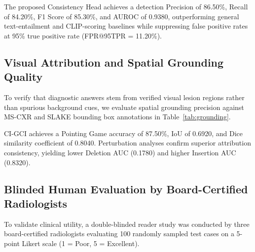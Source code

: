 \documentclass[journal,twoside,web]{ieeecolor}
\begin{document}
The proposed Consistency Head achieves a detection Precision of 86.50\%, Recall of 84.20\%, F1 Score of 85.30\%, and AUROC of 0.9380, outperforming general text-entailment and CLIP-scoring baselines while suppressing false positive rates at 95\% true positive rate (FPR@95TPR = 11.20\%).

\subsection{Visual Attribution and Spatial Grounding Quality}
To verify that diagnostic answers stem from verified visual lesion regions rather than spurious background cues, we evaluate spatial grounding precision against MS-CXR \cite{boecking2022} and SLAKE \cite{liu2021} bounding box annotations in Table~\ref{tab:grounding}.

\begin{table}[t]
\caption{Grounding and Explanation Quality}
\label{tab:grounding}
\centering
\setlength{\tabcolsep}{3pt}
\end{table}

CI-GCI achieves a Pointing Game accuracy of 87.50\%, IoU of 0.6920, and Dice similarity coefficient of 0.8040. Perturbation analyses confirm superior attribution consistency, yielding lower Deletion AUC (0.1780) and higher Insertion AUC (0.8320).

\subsection{Blinded Human Evaluation by Board-Certified Radiologists}
To validate clinical utility, a double-blinded reader study was conducted by three board-certified radiologists evaluating 100 randomly sampled test cases on a 5-point Likert scale (1 = Poor, 5 = Excellent).
\end{document}
